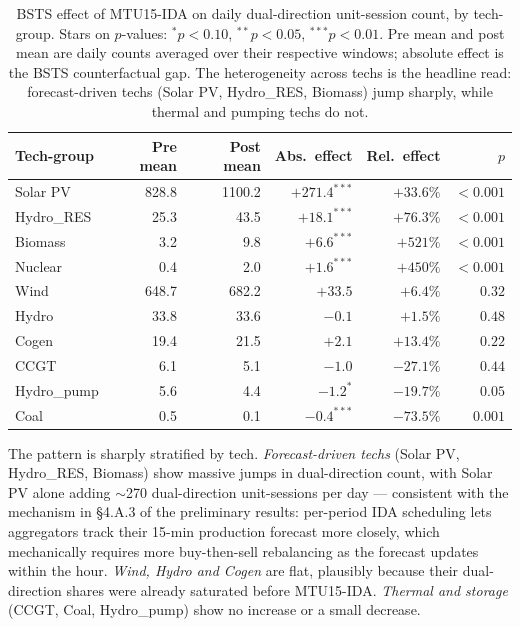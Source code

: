 \documentclass[11pt,a4paper]{article}
\begin{document}
\begin{table}[h]
\centering
\footnotesize
\caption{BSTS effect of MTU15-IDA on daily dual-direction unit-session count, by tech-group. Stars on $p$-values: $^{*}p{<}0.10$, $^{**}p{<}0.05$, $^{***}p{<}0.01$. Pre mean and post mean are daily counts averaged over their respective windows; absolute effect is the BSTS counterfactual gap. The heterogeneity across techs is the headline read: forecast-driven techs (Solar PV, Hydro\_RES, Biomass) jump sharply, while thermal and pumping techs do not.}
\label{tab:bsts-arbitrage}
\begin{tabular}{l r r r r r}
\toprule
Tech-group & Pre mean & Post mean & Abs.\ effect & Rel.\ effect & $p$ \\
\midrule
Solar PV        &  828.8 & 1100.2 & $+271.4^{***}$ & $+33.6\%$ & $<\!0.001$ \\
Hydro\_RES      &   25.3 &   43.5 &  $+18.1^{***}$ & $+76.3\%$ & $<\!0.001$ \\
Biomass         &    3.2 &    9.8 &   $+6.6^{***}$ & $+521\%$  & $<\!0.001$ \\
Nuclear         &    0.4 &    2.0 &   $+1.6^{***}$ & $+450\%$  & $<\!0.001$ \\
\addlinespace
Wind            &  648.7 &  682.2 &  $+33.5$       & $+6.4\%$  & $0.32$ \\
Hydro           &   33.8 &   33.6 &   $-0.1$       & $+1.5\%$  & $0.48$ \\
Cogen           &   19.4 &   21.5 &   $+2.1$       & $+13.4\%$ & $0.22$ \\
\addlinespace
CCGT            &    6.1 &    5.1 &   $-1.0$       & $-27.1\%$ & $0.44$ \\
Hydro\_pump     &    5.6 &    4.4 &   $-1.2^{*}$   & $-19.7\%$ & $0.05$ \\
Coal            &    0.5 &    0.1 &   $-0.4^{***}$ & $-73.5\%$ & $0.001$ \\
\bottomrule
\end{tabular}
\end{table}

\noindent The pattern is sharply stratified by tech. \emph{Forecast-driven techs} (Solar PV, Hydro\_RES, Biomass) show massive jumps in dual-direction count, with Solar PV alone adding $\sim$270 dual-direction unit-sessions per day --- consistent with the mechanism in §4.A.3 of the preliminary results: per-period IDA scheduling lets aggregators track their 15-min production forecast more closely, which mechanically requires more buy-then-sell rebalancing as the forecast updates within the hour. \emph{Wind, Hydro and Cogen} are flat, plausibly because their dual-direction shares were already saturated before MTU15-IDA. \emph{Thermal and storage} (CCGT, Coal, Hydro\_pump) show no increase or a small decrease.
\end{document}
